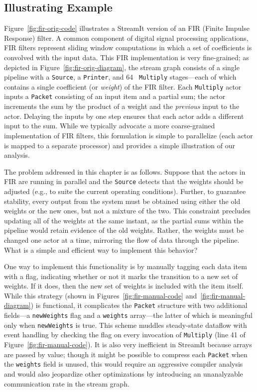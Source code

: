 
\subsection*{Illustrating Example}

Figure~\ref{fig:fir-orig-code} illustrates a StreamIt version of an
FIR (Finite Impulse Response) filter.  A common component of digital
signal processing applications, FIR filters represent sliding window
computations in which a set of coefficients is convolved with the
input data.  This FIR implementation is very fine-grained; as depicted
in Figure~\ref{fig:fir-orig-diagram}, the stream graph consists of a
single pipeline with a {\tt Source}, a {\tt Printer}, and 64 {\tt
Multiply} stages---each of which contains a single coefficient (or
{\it weight}) of the FIR filter.  Each {\tt Multiply} actor inputs a
{\tt Packet} consisting of an input item and a partial sum; the actor
increments the sum by the product of a weight and the {\it previous}
input to the actor.  Delaying the inputs by one step ensures that each
actor adds a different input to the sum.  While we typically advocate
a more coarse-grained implementation of FIR filters, this formulation
is simple to parallelize (each actor is mapped to a separate
processor) and provides a simple illustration of our analysis.

The problem addressed in this chapter is as follows.  Suppose that the
actors in FIR are running in parallel and the {\tt Source} detects
that the weights should be adjusted (e.g., to suite the current
operating conditions).  Further, to guarantee stability, every output
from the system must be obtained using either the old weights or the
new ones, but not a mixture of the two.  This constraint precludes
updating all of the weights at the same instant, as the partial sums
within the pipeline would retain evidence of the old weights.  Rather,
the weights must be changed one actor at a time, mirroring the flow of
data through the pipeline.  What is a simple and efficient way to
implement this behavior?

One way to implement this functionality is by manually tagging each
data item with a flag, indicating whether or not it marks the
transition to a new set of weights.  If it does, then the new set of
weights is included with the item itself.  While this strategy (shown
in Figures~\ref{fig:fir-manual-code} and~\ref{fig:fir-manual-diagram})
is functional, it complicates the {\tt Packet} structure with two
additional fields---a {\tt newWeights} flag and a {\tt weights}
array---the latter of which is meaningful only when {\tt newWeights}
is true.  This scheme muddles steady-state dataflow with event
handling by checking the flag on every invocation of {\tt Multiply}
(line 41 of Figure~\ref{fig:fir-manual-code}).  It is also very
inefficient in StreamIt because arrays are passed by value; though it
might be possible to compress each {\tt Packet} when the {\tt weights}
field is unused, this would require an aggressive compiler analysis
and would also jeopardize other optimizations by introducing an
unanalyzable communication rate in the stream graph.

